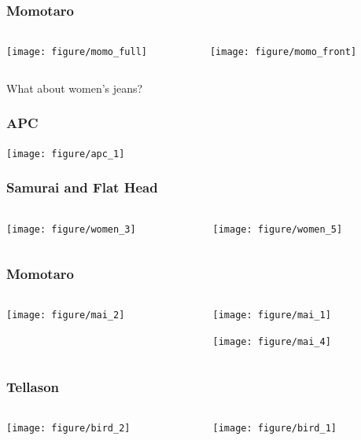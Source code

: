 \documentclass{beamer}
\begin{document}
\begin{frame}
  \frametitle{Momotaro}
  \begin{columns}
    \begin{column}{0.5\textwidth}
      \texttt{[image: figure/momo\_full]}
    \end{column}
    \begin{column}{0.5\textwidth}
      \texttt{[image: figure/momo\_front]}
    \end{column}
  \end{columns}
\end{frame}


\begin{frame}
  What about women's jeans?
\end{frame}

\begin{frame}
  \frametitle{APC}
  \begin{center}
    \texttt{[image: figure/apc\_1]}
  \end{center}
\end{frame}

\begin{frame}
  \frametitle{Samurai and Flat Head}
  \begin{columns}
    \begin{column}{0.5\textwidth}
      \texttt{[image: figure/women\_3]}
    \end{column}
    \begin{column}{0.5\textwidth}
      \texttt{[image: figure/women\_5]}
    \end{column}
  \end{columns}
\end{frame}

\begin{frame}
  \frametitle{Momotaro}
  \begin{columns}
    \begin{column}{0.5\textwidth}
      \texttt{[image: figure/mai\_2]}
    \end{column}
    \begin{column}{0.5\textwidth}
      \texttt{[image: figure/mai\_1]}

      \texttt{[image: figure/mai\_4]}
    \end{column}
  \end{columns}
\end{frame}

\begin{frame}
  \frametitle{Tellason}
  \begin{columns}
    \begin{column}{0.5\textwidth}
      \texttt{[image: figure/bird\_2]}
    \end{column}
    \begin{column}{0.5\textwidth}
      \texttt{[image: figure/bird\_1]}
    \end{column}
  \end{columns}
\end{frame}
\end{document}

